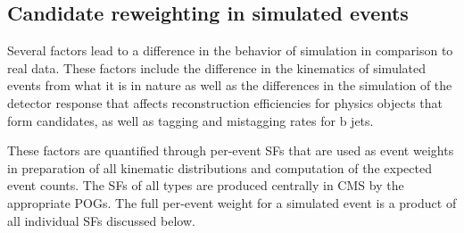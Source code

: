 \subsection{Candidate reweighting in simulated events}

Several factors lead to a difference in the behavior of simulation in comparison to real data. These factors include the difference in the kinematics of simulated events from what it is in nature as well as the differences in the simulation of the detector response that affects reconstruction efficiencies for physics objects that form candidates, as well as tagging and mistagging rates for b jets. 

These factors are quantified through per-event SFs that are used as event weights in preparation of all kinematic distributions and computation of the expected event counts. The SFs of all types are produced centrally in CMS by the appropriate POGs. The full per-event weight for a simulated event is a product of all individual SFs discussed below.

